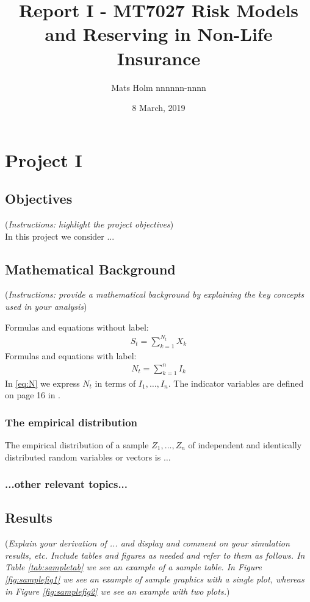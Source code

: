 \documentclass[11pt]{article}
\title{Report I - MT7027 Risk Models and Reserving in Non-Life Insurance}
\author{Mats Holm nnnnnn-nnnn }
\date{8 March, 2019}                                           %
\begin{document}
\maketitle
\section*{Project I}
\subsection*{Objectives}
({\it Instructions: highlight the project objectives})
\\
In this project we consider ...

\subsection*{Mathematical Background}
({\it Instructions: provide a mathematical background by explaining the key concepts used in your analysis})

Formulas and equations without label:
\begin{align*}
	S_t = \sum_{k=1}^{N_t} X_k
\end{align*}
Formulas and equations with label:
\begin{align}\label{eq:N}
	N_t = \sum_{k=1}^{n} I_k
\end{align}
In \eqref{eq:N} we express $N_t$ in terms of $I_1,\dots,I_n$. The indicator variables are defined on page 16 in \cite{Wuthrich-Merz-13}.

\subsubsection*{The empirical distribution}
The empirical distribution of a sample $Z_1, \dots, Z_n$ of independent and identically distributed random variables or vectors is $\ldots$

\subsubsection*{...other relevant topics...}

\subsection*{Results}

({\it Explain your derivation of ... and display and comment on your simulation results, etc. Include tables and figures as needed and refer to them as follows. In Table \ref{tab:sampletab} we see an example of a sample table. In Figure \ref{fig:samplefig1} we see an example of sample graphics with a single plot, whereas in Figure \ref{fig:samplefig2} we see an example with two plots.}) 
\end{document}
